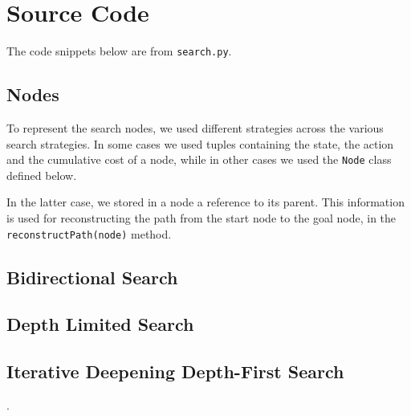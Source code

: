 \chapter{Source Code} 

The code snippets below are from \verb|search.py|.



\section{Nodes}
\label{sec:nodes}

To represent the search nodes, we used different strategies across the various search strategies. In some cases we used tuples containing the state, the action and the cumulative cost of a node, while in other cases we used the \verb|Node| class defined below.

In the latter case, we stored in a node a reference to its parent. This information is used for reconstructing the path from the start node to the goal node, in the \verb|reconstructPath(node)| method.




  
  
  
\section{Bidirectional Search}
\label{sec:code_bs}





\section{Depth Limited Search}
\label{sec:code_dls}





\section{Iterative Deepening Depth-First Search}
\label{sec:code_iddfs}.

